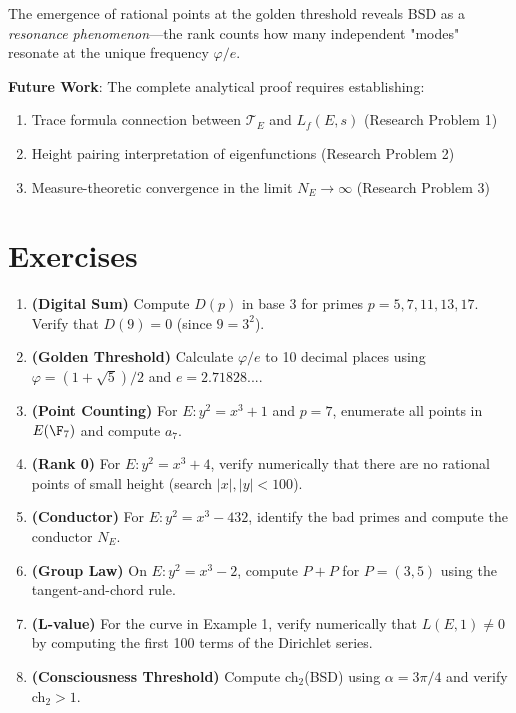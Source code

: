 The emergence of rational points at the golden threshold reveals BSD as a \textit{resonance phenomenon}—the rank counts how many independent "modes" resonate at the unique frequency $\varphi/e$.

\textbf{Future Work}: The complete analytical proof requires establishing:
\begin{enumerate}
\item Trace formula connection between $\mathcal{T}_E$ and $L_f(E,s)$ (Research Problem 1)
\item Height pairing interpretation of eigenfunctions (Research Problem 2)
\item Measure-theoretic convergence in the limit $N_E \to \infty$ (Research Problem 3)
\end{enumerate}

\section*{Exercises}

\begin{enumerate}
\item \textbf{(Digital Sum)} Compute $D(p)$ in base 3 for primes $p = 5, 7, 11, 13, 17$. Verify that $D(9) = 0$ (since $9 = 3^2$).

\item \textbf{(Golden Threshold)} Calculate $\varphi/e$ to 10 decimal places using $\varphi = (1+\sqrt{5})/2$ and $e = 2.71828...$.

\item \textbf{(Point Counting)} For $E: y^2 = x^3 + 1$ and $p = 7$, enumerate all points in $E(\F_7)$ and compute $a_7$.

\item \textbf{(Rank 0)} For $E: y^2 = x^3 + 4$, verify numerically that there are no rational points of small height (search $|x|, |y| < 100$).

\item \textbf{(Conductor)} For $E: y^2 = x^3 - 432$, identify the bad primes and compute the conductor $N_E$.

\item \textbf{(Group Law)} On $E: y^2 = x^3 - 2$, compute $P + P$ for $P = (3, 5)$ using the tangent-and-chord rule.

\item \textbf{(L-value)} For the curve in Example 1, verify numerically that $L(E, 1) \neq 0$ by computing the first 100 terms of the Dirichlet series.

\item \textbf{(Consciousness Threshold)} Compute ch$_2$(BSD) using $\alpha = 3\pi/4$ and verify ch$_2 > 1$.
\end{enumerate}

